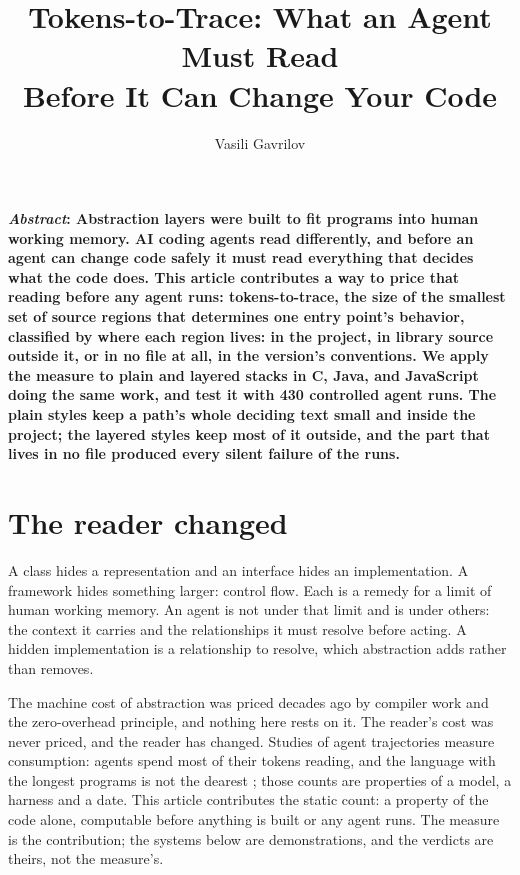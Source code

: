 \documentclass[journal]{IEEEtran}
\title{Tokens-to-Trace: What an Agent Must Read\\Before It Can Change Your Code}
\author{Vasili Gavrilov}
\begin{document}
\maketitle

{\small\bfseries\noindent\textit{Abstract}:
Abstraction layers were built to fit programs into human working
memory. AI coding agents read differently, and
before an agent can change code safely it must read everything that
decides what the code does. This article contributes a way to price
that reading before any agent runs: tokens-to-trace, the size of the
smallest set of source regions that determines one entry point's
behavior, classified by where each region lives: in the project, in
library source outside it, or in no file at all, in the version's
conventions. We apply the measure to plain and layered stacks
in C, Java, and JavaScript doing the same work, and test it with 430
controlled agent runs. The plain styles keep a path's whole deciding
text small and inside the project; the layered styles keep most of it
outside, and the part that lives in no file produced every silent
failure of the runs.\par}
\vspace{6pt}

\section*{The reader changed}

A class hides a representation and an interface hides an implementation.
A framework hides something larger: control flow. Each is a remedy for a
limit of human working memory. An agent is not under that limit and is
under others: the context it carries and the relationships it must
resolve before acting. A hidden implementation is a relationship to
resolve, which abstraction adds rather than removes.

The machine cost of abstraction was priced decades ago by compiler work
and the zero-overhead principle, and nothing here rests on it. The
reader's cost was never priced, and the reader has changed. Studies of
agent trajectories measure consumption: agents spend most of their
tokens reading, and the language with the longest programs is not the
dearest \cite{tokenmax,spend}; those counts are properties of a model,
a harness and a date. This article contributes the static count: a
property of the code alone, computable before anything is built or any
agent runs. The measure is the contribution; the systems below are
demonstrations, and the verdicts are theirs, not the measure's.
\end{document}
